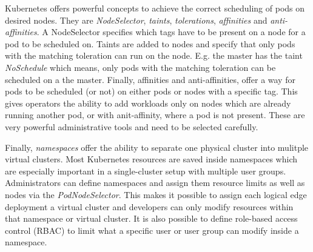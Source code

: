 Kubernetes offers powerful concepts to achieve the correct scheduling of pods on desired nodes. They are \textit{NodeSelector}, \textit{taints}, \textit{tolerations}, \textit{affinities} and \textit{anti-affinities}. A NodeSelector specifies which tags have to be present on a node for a pod to be scheduled on. Taints are added to nodes and specify that only pods with the matching toleration can run on the node. E.g. the master has the taint \textit{NoSchedule} which means, only pods with the matching toleration can be scheduled on a the master. Finally, affinities and anti-affinities, offer a way for pods to be scheduled (or not) on either pods or nodes with a specific tag. This gives operators the ability to add workloads only on nodes which are already running another pod, or with anit-affinity, where a pod is not present. These are very powerful administrative tools and need to be selected carefully.

Finally, \textit{namespaces} offer the ability to separate one physical cluster into mulitple virtual clusters. Most Kubernetes resources are saved inside namespaces which are especially important in a single-cluster setup with multiple user groups. Administrators can define namespaces and assign them resource limits as well as nodes via the \textit{PodNodeSelector}. This makes it possible to assign each logical edge deployment a virtual cluster and developers can only modify resources within that namespace or virtual cluster. It is also possible to define role-based access control (RBAC) to limit what a specific user or user group can modify inside a namespace. 
